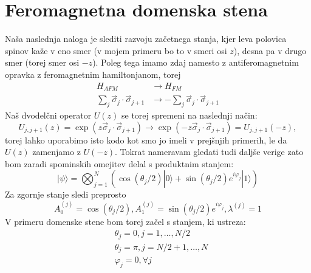 \documentclass{article}
\begin{document}
\section*{Feromagnetna domenska stena}

Naša naslednja naloga je slediti razvoju začetnega stanja, kjer leva polovica spinov kaže v eno smer (v mojem primeru bo to v smeri osi $z$), desna pa v drugo smer (torej smer osi $-z$).
Poleg tega imamo zdaj namesto z antiferomagnetnim opravka z feromagnetnim hamiltonjanom, torej
\begin{align*}
H_{AFM} &\to H_{FM} \\
\sum_j \vec{\sigma}_j \cdot \vec{\sigma}_{j+1} &\to -\sum_j \vec{\sigma}_j \cdot \vec{\sigma}_{j+1} 
\end{align*}
Naš dvodelčni operator $U(z)$ se torej spremeni na naslednji način:
\begin{equation*}
U_{j,j+1} (z) = \exp(z \vec{\sigma}_j \cdot \vec{\sigma}_{j+1}) \to \exp(- z \vec{\sigma}_j \cdot \vec{\sigma}_{j+1}) = U_{j,j+1} (-z),
\end{equation*}
torej lahko uporabimo isto kodo kot smo jo imeli v prejšnjih primerih, le da $U(z)$ zamenjamo z $U(-z)$.
Tokrat nameravam gledati tudi daljše verige zato bom zaradi spominskih omejitev delal s produktnim stanjem:
\begin{equation*}
| \psi \rangle = \bigotimes_{j=1}^N \left( \cos (\theta_j/2) |0 \rangle + \sin(\theta_j/2) e^{i \varphi_j} |1 \rangle \right)
\end{equation*}
Za zgornje stanje sledi preprosto
\begin{equation*}
A^{(j)}_0 = \cos(\theta_j/2),  A^{(j)}_1 = \sin(\theta_j/2) e^{i \varphi_j}, \lambda^{(j)}=1
\end{equation*}
V primeru domenske stene bom torej začel s stanjem, ki ustreza:
\begin{align*}
&\theta_j = 0, j=1, \dots, N/2 \\
&\theta_j = \pi, j=N/2+1 , \dots , N \\
&\varphi_j = 0, \forall j
\end{align*}
\end{document}
